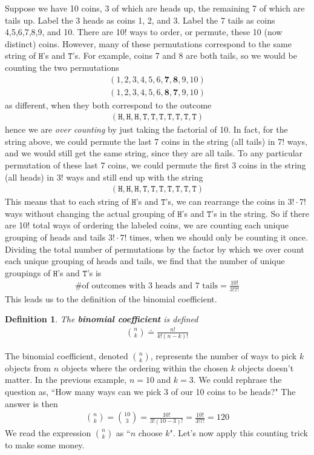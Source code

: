 \documentclass[11pt,letterpaper]{article}
\newcommand\hd{\texttt{H}}
\newcommand\tl{\texttt{T}}
\numberwithin{theorem}{section}
\newtheorem{definition}[theorem]{Definition}
\numberwithin{definition}{section}
\numberwithin{lemma}{section}
\numberwithin{corollary}{section}
\numberwithin{proposition}{section}
\theoremstyle{definition}
\numberwithin{remark}{section}
\numberwithin{claim}{section}
\numberwithin{observation}{section}
\numberwithin{fact}{section}
\numberwithin{assumption}{section}
\numberwithin{example}{section}
\numberwithin{exercise}{section}
\begin{document}
Suppose we have 10 coins, 3 of which are heads up, the remaining 7 of which are tails up. Label the 3 heads as coins 1, 2, and 3. Label the 7 tails as coins 4,5,6,7,8,9, and 10. There are 10! ways to order, or permute, these 10 (now distinct) coins. However, many of these permutations correspond to the same string of $\hd$'s and $\tl$'s. For example, coins 7 and 8 are both tails, so we would be counting the two permutations
\begin{align*}
(1,2,3,4,5,6,\textbf{7},\textbf{8},9,10) \\
(1,2,3,4,5,6,\textbf{8},\textbf{7},9,10)
\end{align*}
as different, when they both correspond to the outcome
\begin{align*}
(\hd,\hd,\hd,\tl,\tl,\tl,\tl,\tl,\tl,\tl) 
\end{align*}
hence we are \textit{over counting} by just taking the factorial of 10. In fact, for the string above, we could permute the last 7 coins in the string (all tails) in 7! ways, and we would still get the same string, since they are all tails. To any particular permutation of these last 7 coins, we could permute the first 3 coins in the string (all heads) in 3! ways and still end up with the string
\begin{align*}
(\hd,\hd,\hd,\tl,\tl,\tl,\tl,\tl,\tl,\tl) 
\end{align*}
This means that to each string of $\hd$'s and $\tl$'s, we can rearrange the coins in $3!\cdot 7!$ ways without changing the actual grouping of $\hd$'s and $\tl$'s in the string. So if there are 10! total ways of ordering the labeled coins, we are counting each unique grouping of heads and tails $3!\cdot 7!$ times, when we should only be counting it once. Dividing the total number of permutations by the factor by which we over count each unique grouping of heads and tails, we find that the number of unique groupings of $\hd$'s and $\tl$'s is
\begin{align*}
\text{\# of outcomes with 3 heads and 7 tails} = \frac{10!}{3!7!}
\end{align*}
This leads us to the definition of the binomial coefficient.
\begin{definition}
The \textbf{binomial coefficient} is defined
\begin{align*}
\binom{n}{k} \doteq \frac{n!}{k! (n-k)!}
\end{align*}
\end{definition}
The binomial coefficient, denoted $\binom{n}{k}$, represents the number of ways to pick $k$ objects from $n$ objects where the ordering within the chosen $k$ objects doesn't matter. In the previous example, $n=10$ and $k=3$. We could rephrase the question as, ``How many ways can we pick 3 of our 10 coins to be heads?" The answer is then
\begin{align*}
\binom{n}{k} = \binom{10}{3} = \frac{10!}{3! (10 - 3)!} = \frac{10!}{3!7!} = 120
\end{align*}
We read the expression $\binom{n}{k}$ as ``$n$ choose $k$". Let's now apply this counting trick to make some money.
\end{document}

